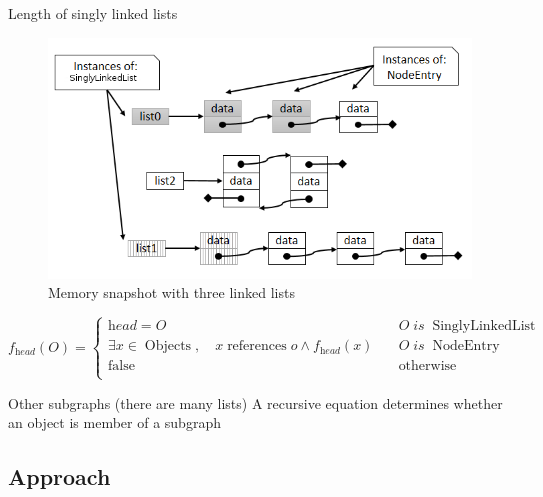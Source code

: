 \documentclass[10pt,xcolor={dvipsnames}]{beamer}
\begin{document}
	\begin{frame}{Length of singly linked lists}
		\begin{figure}[!ht]
			\centering
			\includegraphics[scale=0.3]{../chapter6/fig/lists}
			\vspace{-.3cm}
			\caption{\scriptsize Memory snapshot with three linked lists}
		\end{figure}
		{\footnotesize
		\begin{equation*}
			f_{\textit{head}}\left(O\right) = 
			\begin{cases}
			\textit{head} = O & \quad O \; is \; \operatorname{SinglyLinkedList} \\
			\exists {x \in \operatorname{Objects}}, \quad x \operatorname{references} o \wedge f_{\textit{head}}\left(x\right) & \quad O \; is \; \operatorname{NodeEntry} \\
			\operatorname{false} & \quad \operatorname{otherwise} \\
			\end{cases}
		\end{equation*}
		}
		\vspace{0.2cm}
		\begin{alertblock}{Other subgraphs (there are many lists)}
			A recursive equation determines whether an object is member of a subgraph
		\end{alertblock}
	\end{frame}
	
	\subsection[Approach]{Approach}
	
\end{document}
